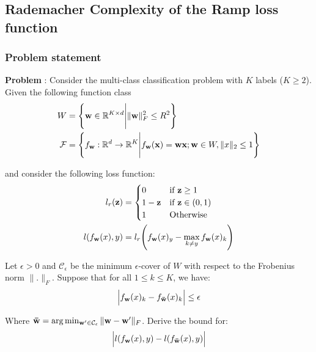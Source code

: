 \newpage
\subsection{Rademacher Complexity of the Ramp loss function}

\subsubsection{Problem statement}
\textbf{Problem} : Consider the multi-class classification problem with $K$ labels ($K\ge2$). Given the following function class
\begin{align*}
    W  &= \Bigg\{ 
        {\bf w}\in \mathbb{R}^{K\times d} \Bigg| \|{\bf w}\|_F^2 \le R^2
     \Bigg\} \\
    \mathcal{F} &= \Bigg\{ 
        f_{{\bf w}}:\mathbb{R}^d \to \mathbb{R}^{K} \Bigg| f_{\bf w}({\bf x}) = {\bf wx}; {\bf w}\in W, \|x\|_2\le 1
     \Bigg\}
\end{align*}

\noindent and consider the following loss function:
\begin{align*}
    l_r({\bf z}) &= \begin{cases}
        0 & \text{if } {\bf z} \ge 1 \\
        1 - {\bf z} &\text{if } {\bf z} \in (0,1) \\ 
        1 &\text{Otherwise}
    \end{cases} \\
    l(f_{\bf w}(x), y) &= l_r\Bigg(f_{\bf w}(x)_y - \max_{k\ne y} f_{\bf w}(x)_k\Bigg)
\end{align*}

\noindent Let $\epsilon > 0$ and $\mathcal{C}_\epsilon$ be the minimum $\epsilon$-cover of $W$ with respect to the Frobenius norm $\|.\|_F$. Suppose that for all $1\le k \le K$, we have:
\begin{align*}
    \Big| 
        f_{\bf w}(x)_k - f_{\bf \bar{w}}(x)_k
     \Big| \le \epsilon
\end{align*}

\noindent Where ${\bf \bar{w}} = \arg\min_{{\bf w'} \in \mathcal{C}_\epsilon} \| {\bf w}-{\bf w'} \|_F$. Derive the bound for:
\begin{align*}
    \Big| 
        l(f_{\bf w}(x), y) - l(f_{\bf \bar{w}}(x), y)
     \Big|
\end{align*}